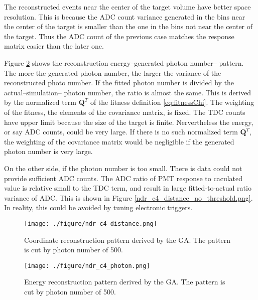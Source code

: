 The reconstructed events near the center of the target volume have better space resolution.
This is because the ADC count variance generated in the bins near the center of the target is smaller
than the one in the bins not near the center of the target. Thus the ADC count of the previous case
matches the response matrix easier than the later one.

Figure \ref{fig:ndr_c4_photon.png} shows the reconstruction energy--generated photon number-- pattern.
The more the generated photon number, the larger the variance of the reconstructed photo number.
If the fitted photon number is divided by the actual--simulation-- photon number, the ratio is
almost the same.
This is derived by the normalized term $\mathbf{Q}^T$ of the fitness definition \ref{eq:fitnessChi}.
The weighting of the fitness, the elements of the covariance matrix, is fixed. The TDC counts have upper limit
because the size of the target is finite. Nervertheless the energy, or say ADC counts, could be very large.
If there is no such normalized term $\mathbf{Q}^T$, the weighting of the covariance matrix would be negligible
if the generated photon number is very large.






On the other side, if the photon number is too small. There is data could not provide sufficient ADC counts.
The ADC ratio of PMT response to caculated value is relative small to the TDC term, and result in large
fitted-to-actual ratio variance of ADC. This is shown in Figure \ref{ndr_c4_distance_no_threshold.png}.
In reality, this could be avoided by tuning electronic triggers.



\begin{figure}[h]
    \centering
    \texttt{[image: ./figure/ndr\_c4\_distance.png]}
    \caption[Coordinate reconstruction I]
{
Coordinate reconstruction pattern derived by the GA.
The pattern is cut by photon number of 500.
}
    \label{fig:ndr_c4_distance.png}
    \end{figure}



\begin{figure}[h]
    \centering
    \texttt{[image: ./figure/ndr\_c4\_photon.png]}
    \caption[Energy reconstruction I]
{
Energy reconstruction pattern derived by the GA.
The pattern is cut by photon number of 500.
}
    \label{fig:ndr_c4_photon.png}
    \end{figure}

